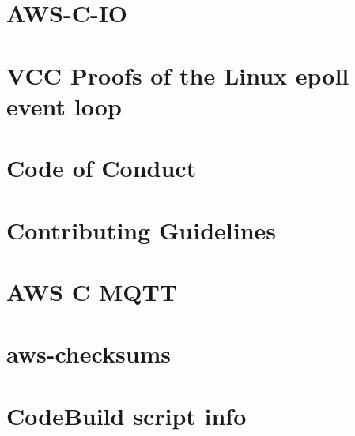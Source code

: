 \documentclass[twoside]{book}
\newcommand{\+}{\discretionary{\mbox{\scriptsize$\hookleftarrow$}}{}{}}
\begin{document}
\chapter{AWS-\/\+C-\/\+IO}
\label{md_crt_aws_crt_cpp_crt_aws_c_io__r_e_a_d_m_e}

\chapter{VCC Proofs of the Linux epoll event loop}
\label{md_crt_aws_crt_cpp_crt_aws_c_io_tests_vcc__r_e_a_d_m_e}

\chapter{Code of Conduct}
\label{md_crt_aws_crt_cpp_crt_aws_c_mqtt__c_o_d_e__o_f__c_o_n_d_u_c_t}

\chapter{Contributing Guidelines}
\label{md_crt_aws_crt_cpp_crt_aws_c_mqtt__c_o_n_t_r_i_b_u_t_i_n_g}

\chapter{AWS C MQTT}
\label{md_crt_aws_crt_cpp_crt_aws_c_mqtt__r_e_a_d_m_e}

\chapter{aws-\/checksums}
\label{md_crt_aws_crt_cpp_crt_aws_checksums__r_e_a_d_m_e}

\chapter{Code\+Build script info}
\label{md_crt_aws_crt_cpp_crt_s2n_codebuild__r_e_a_d_m_e}

\end{document}
